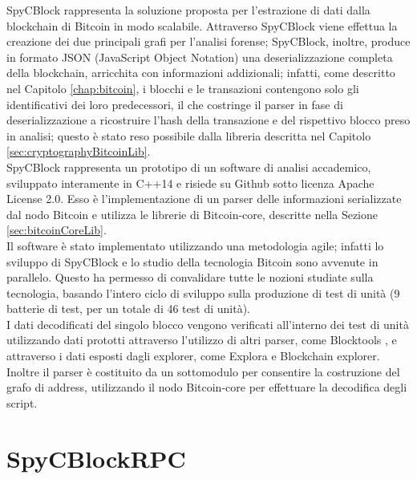 SpyCBlock rappresenta la soluzione proposta per l'estrazione di dati dalla blockchain di Bitcoin in modo scalabile. Attraverso SpyCBlock viene effettua la creazione dei due principali grafi per l'analisi forense; SpyCBlock, inoltre, produce in formato JSON (JavaScript Object Notation) una deserializzazione completa della blockchain, arricchita con informazioni addizionali; infatti, come descritto nel Capitolo \ref{chap:bitcoin}, i blocchi e le transazioni contengono solo gli identificativi dei loro predecessori, il che costringe il parser in fase di deserializzazione a ricostruire l'hash della transazione e del rispettivo blocco preso in analisi; questo è stato reso possibile dalla libreria  descritta nel Capitolo \ref{sec:cryptographyBitcoinLib}.\\
SpyCBlock rappresenta un prototipo di un software di analisi accademico, sviluppato interamente in C++14 e risiede su Github sotto licenza Apache License 2.0. Esso è l'implementazione di un parser delle informazioni serializzate dal nodo Bitcoin e utilizza le librerie di Bitcoin-core, descritte nella Sezione \ref{sec:bitcoinCoreLib}.\\
Il software è stato implementato utilizzando una metodologia agile; infatti lo sviluppo di SpyCBlock e lo studio della tecnologia Bitcoin sono avvenute in parallelo. Questo ha permesso di convalidare tutte le nozioni studiate sulla tecnologia, basando l'intero ciclo di sviluppo sulla produzione di test di unità (9 batterie di test, per un totale di 46 test di unità).\\
I dati decodificati del singolo blocco vengono verificati all'interno dei test di unità utilizzando dati prototti attraverso l'utilizzo di altri parser, come Blocktools \cite{parser:blocktools}, e attraverso i dati esposti dagli explorer, come Explora \cite{blockstream:esplora} e Blockchain explorer\cite{blockchain:explorer}.\\
Inoltre il parser è costituito da un sottomodulo per consentire la costruzione del grafo di address, utilizzando il nodo Bitcoin-core per effettuare la decodifica degli script.

\section{SpyCBlockRPC} \label{sec:spycblockrpc}


